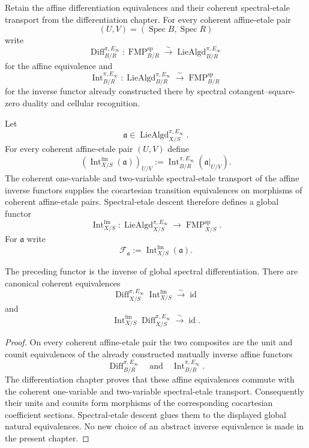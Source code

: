 Retain the affine differentiation equivalences and their coherent
spectral-etale transport from the differentiation chapter.  For every coherent
affine-etale pair
\[
    (U,V)=(\operatorname{Spec}B,\operatorname{Spec}R)
\]
write
\[
    \operatorname{Diff}^{\pi,E_\infty}_{B/R}:
    \operatorname{FMP}^{\mathrm{sp}}_{B/R}
    \xrightarrow{\sim}
    \operatorname{LieAlgd}^{\pi,E_\infty}_{B/R}
\]
for the affine equivalence and
\[
    \operatorname{Int}^{\pi,E_\infty}_{B/R}:
    \operatorname{LieAlgd}^{\pi,E_\infty}_{B/R}
    \xrightarrow{\sim}
    \operatorname{FMP}^{\mathrm{sp}}_{B/R}
\]
for the inverse functor already constructed there by spectral
cotangent--square-zero duality and cellular recognition.

\begin{definition}
\label{def:bnli-formal-integration}
Let
\[
    \mathfrak a\in\operatorname{LieAlgd}^{\pi,E_\infty}_{X/S}.
\]
For every coherent affine-etale pair $(U,V)$ define
\[
    \left(
      \operatorname{Int}^{\mathrm{fm}}_{X/S}(\mathfrak a)
    \right)_{U/V}
    :=
    \operatorname{Int}^{\pi,E_\infty}_{B/R}
    \left(
      \mathfrak a|_{U/V}
    \right).
\]
The coherent one-variable and two-variable spectral-etale transport of the
affine inverse functors supplies the cocartesian transition equivalences on
morphisms of coherent affine-etale pairs.  Spectral-etale descent therefore
defines a global functor
\[
\boxed{
    \operatorname{Int}^{\mathrm{fm}}_{X/S}:
    \operatorname{LieAlgd}^{\pi,E_\infty}_{X/S}
    \longrightarrow
    \operatorname{FMP}^{\mathrm{sp}}_{X/S}.}
\]
For $\mathfrak a$ write
\[
    \mathcal F_{\mathfrak a}
    :=
    \operatorname{Int}^{\mathrm{fm}}_{X/S}(\mathfrak a).
\]
\end{definition}

\begin{theorem}
\label{thm:bnli-formal-lie-three}
The preceding functor is the inverse of global spectral differentiation.
There are canonical coherent equivalences
\[
\boxed{
    \operatorname{Diff}^{\pi,E_\infty}_{X/S}
    \operatorname{Int}^{\mathrm{fm}}_{X/S}
    \xrightarrow{\sim}
    \operatorname{id}}
\]
and
\[
\boxed{
    \operatorname{Int}^{\mathrm{fm}}_{X/S}
    \operatorname{Diff}^{\pi,E_\infty}_{X/S}
    \xrightarrow{\sim}
    \operatorname{id}.}
\]
\end{theorem}

\begin{proof}
On every coherent affine-etale pair the two composites are the unit and
counit equivalences of the already constructed mutually inverse affine
functors
\[
    \operatorname{Diff}^{\pi,E_\infty}_{B/R}
    \quad\text{and}\quad
    \operatorname{Int}^{\pi,E_\infty}_{B/R}.
\]
The differentiation chapter proves that these affine equivalences commute
with the coherent one-variable and two-variable spectral-etale transport.
Consequently their units and counits form morphisms of the corresponding
cocartesian coefficient sections.  Spectral-etale descent glues them to the
displayed global natural equivalences.  No new choice of an abstract inverse
equivalence is made in the present chapter.
\end{proof}

